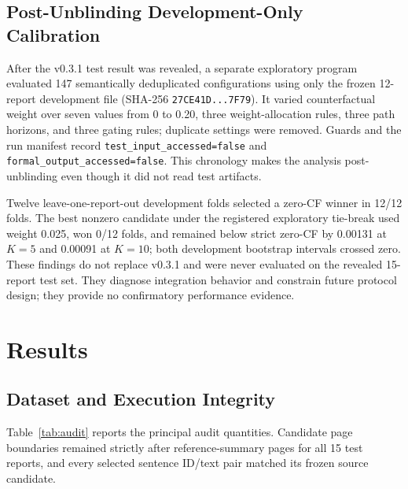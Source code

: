 \documentclass[applsci,article,submit,moreauthors]{Definitions/mdpi}
\begin{document}
\subsection{Post-Unblinding Development-Only Calibration}

After the v0.3.1 test result was revealed, a separate exploratory program evaluated 147 semantically deduplicated configurations using only the frozen 12-report development file (SHA-256 \texttt{27CE41D...7F79}). It varied counterfactual weight over seven values from 0 to 0.20, three weight-allocation rules, three path horizons, and three gating rules; duplicate settings were removed. Guards and the run manifest record \texttt{test\_input\_accessed=false} and \texttt{formal\_output\_accessed=false}. This chronology makes the analysis post-unblinding even though it did not read test artifacts.

Twelve leave-one-report-out development folds selected a zero-CF winner in 12/12 folds. The best nonzero candidate under the registered exploratory tie-break used weight 0.025, won 0/12 folds, and remained below strict zero-CF by 0.00131 at $K=5$ and 0.00091 at $K=10$; both development bootstrap intervals crossed zero. These findings do not replace v0.3.1 and were never evaluated on the revealed 15-report test set. They diagnose integration behavior and constrain future protocol design; they provide no confirmatory performance evidence.

\section{Results}

\subsection{Dataset and Execution Integrity}

Table~\ref{tab:audit} reports the principal audit quantities. Candidate page boundaries remained strictly after reference-summary pages for all 15 test reports, and every selected sentence ID/text pair matched its frozen source candidate.
\end{document}
